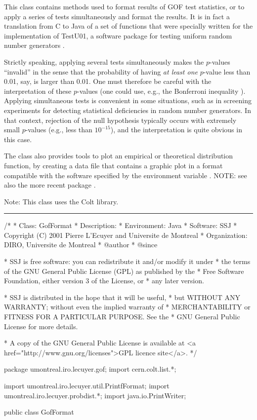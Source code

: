 
This class contains methods used to format results of GOF
test statistics, or to apply a series of tests
simultaneously and format the results.
It is in fact a translation from C to Java of a set of functions that
were specially written for the implementation of TestU01, a software
package for testing uniform random number generators \cite{iLEC01t}.

Strictly speaking, applying several tests simultaneously makes the
$p$-values ``invalid'' in the sense that the probability of having
{\em at least one\/} $p$-value less than 0.01, say, is larger than 0.01.
One must therefore be careful with the interpretation of these
$p$-values (one could use, e.g., the Bonferroni inequality \cite{sLAW00a}).
Applying simultaneous tests is convenient in some situations, such as in
screening experiments for detecting statistical deficiencies
in random number generators.  In that context, rejection of the null
hypothesis typically occurs with extremely small $p$-values (e.g., less
than $10^{-15}$), and the interpretation is quite obvious in this case.

The class also provides tools to plot an empirical or
theoretical distribution function, by creating a data file that
contains a graphic plot in a format compatible with the software
specified by the environment variable .
  NOTE: see also the more recent package
  .

Note: This class uses the Colt library.

\bigskip\hrule
\begin{code}
\begin{hide}
/*
 * Class:        GofFormat
 * Description:
 * Environment:  Java
 * Software:     SSJ
 * Copyright (C) 2001  Pierre L'Ecuyer and Universite de Montreal
 * Organization: DIRO, Universite de Montreal
 * @author
 * @since

 * SSJ is free software: you can redistribute it and/or modify it under
 * the terms of the GNU General Public License (GPL) as published by the
 * Free Software Foundation, either version 3 of the License, or
 * any later version.

 * SSJ is distributed in the hope that it will be useful,
 * but WITHOUT ANY WARRANTY; without even the implied warranty of
 * MERCHANTABILITY or FITNESS FOR A PARTICULAR PURPOSE.  See the
 * GNU General Public License for more details.

 * A copy of the GNU General Public License is available at
   <a href="http://www.gnu.org/licenses">GPL licence site</a>.
 */
\end{hide}
package umontreal.iro.lecuyer.gof;
   import cern.colt.list.*;
\begin{hide}
import umontreal.iro.lecuyer.util.PrintfFormat;
import umontreal.iro.lecuyer.probdist.*;
import java.io.PrintWriter;\end{hide}

public class GofFormat\begin{hide} {
   private GofFormat() {} \end{hide}
\end{code}

